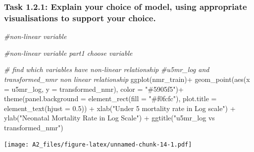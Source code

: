 \documentclass[
]{article}
\newenvironment{Shaded}{\begin{snugshade}}{\end{snugshade}}
\newcommand{\AttributeTok}[1]{\textcolor[rgb]{0.77,0.63,0.00}{#1}}
\newcommand{\CommentTok}[1]{\textcolor[rgb]{0.56,0.35,0.01}{\textit{#1}}}
\newcommand{\FloatTok}[1]{\textcolor[rgb]{0.00,0.00,0.81}{#1}}
\newcommand{\FunctionTok}[1]{\textcolor[rgb]{0.00,0.00,0.00}{#1}}
\newcommand{\NormalTok}[1]{#1}
\newcommand{\SpecialCharTok}[1]{\textcolor[rgb]{0.00,0.00,0.00}{#1}}
\newcommand{\StringTok}[1]{\textcolor[rgb]{0.31,0.60,0.02}{#1}}
\begin{document}
\hypertarget{task-1.2.1-explain-your-choice-of-model-using-appropriate-visualisations-to-support-your-choice.}{%
\subsubsection{Task 1.2.1: Explain your choice of model, using
appropriate visualisations to support your
choice.}\label{task-1.2.1-explain-your-choice-of-model-using-appropriate-visualisations-to-support-your-choice.}}

\begin{Shaded}
\begin{Highlighting}[]
\CommentTok{\#non{-}linear variable}

\CommentTok{\#non{-}linear variable part1 choose variable}


\CommentTok{\# find which variables have non{-}linear relationship}
\CommentTok{\#u5mr\_log and transformed\_nmr non linear relationship}
\FunctionTok{ggplot}\NormalTok{(nmr\_train)}\SpecialCharTok{+}
  \FunctionTok{geom\_point}\NormalTok{(}\FunctionTok{aes}\NormalTok{(}\AttributeTok{x =}\NormalTok{ u5mr\_log, }\AttributeTok{y =}\NormalTok{ transformed\_nmr), }\AttributeTok{color =} \StringTok{"\#5905f5"}\NormalTok{)}\SpecialCharTok{+}
  \FunctionTok{theme}\NormalTok{(}\AttributeTok{panel.background =} \FunctionTok{element\_rect}\NormalTok{(}\AttributeTok{fill =} \StringTok{"\#f0fcfc"}\NormalTok{),}
        \AttributeTok{plot.title =} \FunctionTok{element\_text}\NormalTok{(}\AttributeTok{hjust =} \FloatTok{0.5}\NormalTok{)) }\SpecialCharTok{+}
  \FunctionTok{xlab}\NormalTok{(}\StringTok{"Under 5 mortality rate in Log scale"}\NormalTok{) }\SpecialCharTok{+}
  \FunctionTok{ylab}\NormalTok{(}\StringTok{"Neonatal Mortality Rate in Log Scale"}\NormalTok{) }\SpecialCharTok{+}
  \FunctionTok{ggtitle}\NormalTok{(}\StringTok{"u5mr\_log vs transformed\_nmr"}\NormalTok{)}
\end{Highlighting}
\end{Shaded}

\texttt{[image: A2\_files/figure-latex/unnamed-chunk-14-1.pdf]}
\end{document}
